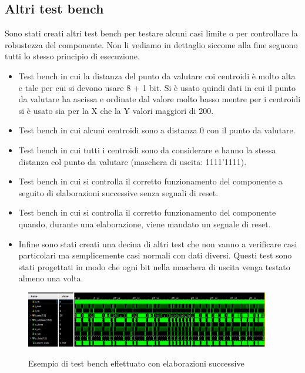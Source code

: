 \documentclass{article}
\begin{document}
\subsection{Altri test bench}
Sono stati creati altri test bench per testare alcuni casi limite o per controllare la robustezza del componente. Non li vediamo in dettaglio siccome alla fine seguono tutti lo stesso principio di esecuzione.
\begin{itemize}
    \item Test bench in cui la distanza del punto da valutare coi centroidi è molto alta e tale per cui si devono usare 8 + 1 bit. Si è usato quindi dati in cui il punto da valutare ha ascissa e ordinate dal valore molto basso mentre per i centroidi si è usato sia per la X che la Y valori maggiori di 200.
    \item Test bench in cui alcuni centroidi sono a distanza 0 con il punto da valutare.
    \item Test bench in cui tutti i centroidi sono da considerare e hanno la stessa distanza col punto da valutare (maschera di uscita: 1111'1111).
    \item Test bench in cui si controlla il corretto funzionamento del componente a seguito di elaborazioni successive senza segnali di reset.
    \item Test bench in cui si controlla il corretto funzionamento del componente quando, durante una elaborazione, viene mandato un segnale di reset.
    \item Infine sono stati creati una decina di altri test che non vanno a verificare casi particolari ma semplicemente casi normali con dati diversi. Questi test sono stati progettati in modo che ogni bit nella maschera di uscita venga testato almeno una volta.
\end{itemize}
\begin{figure}[H]
    \centering
    \caption{Esempio di test bench effettuato con elaborazioni successive}
    \includegraphics[width=0.95\textwidth]{images/altri-test-bench.png}
    \label{fig:altri-test-bench}
\end{figure}

\vspace{4mm}
\titlerule[0.4pt]
\end{document}
